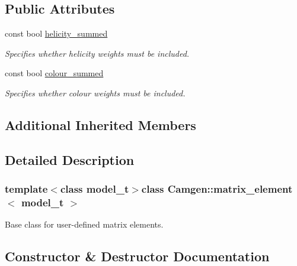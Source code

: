 \subsection*{Public Attributes}
\begin{DoxyCompactItemize}
\item 
\hypertarget{a00363_af30076e3c819c11fe0bb3a83b67adec7}{}const bool \hyperlink{a00363_af30076e3c819c11fe0bb3a83b67adec7}{helicity\+\_\+summed}\label{a00363_af30076e3c819c11fe0bb3a83b67adec7}

\begin{DoxyCompactList}\small\item\em Specifies whether helicity weights must be included. \end{DoxyCompactList}\item 
\hypertarget{a00363_ada370a9920aa59784420f2874291123d}{}const bool \hyperlink{a00363_ada370a9920aa59784420f2874291123d}{colour\+\_\+summed}\label{a00363_ada370a9920aa59784420f2874291123d}

\begin{DoxyCompactList}\small\item\em Specifies whether colour weights must be included. \end{DoxyCompactList}\end{DoxyCompactItemize}
\subsection*{Additional Inherited Members}


\subsection{Detailed Description}
\subsubsection*{template$<$class model\+\_\+t$>$class Camgen\+::matrix\+\_\+element$<$ model\+\_\+t $>$}

Base class for user-\/defined matrix elements. 

\subsection{Constructor \& Destructor Documentation}
\hypertarget{a00363_a27e710a7f1c07b29a465102b259f7021}{}
